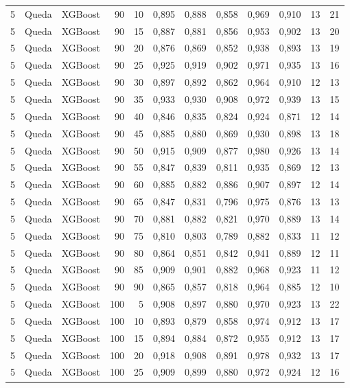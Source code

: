 \begin{longtable}{@{}rllrrrrrrrrr@{}}
5 & Queda & XGBoost & 90 & 10 & 0,895 & 0,888 & 0,858 & 0,969 & 0,910 & 13 & 21 \\
5 & Queda & XGBoost & 90 & 15 & 0,887 & 0,881 & 0,856 & 0,953 & 0,902 & 13 & 20 \\
5 & Queda & XGBoost & 90 & 20 & 0,876 & 0,869 & 0,852 & 0,938 & 0,893 & 13 & 19 \\
5 & Queda & XGBoost & 90 & 25 & 0,925 & 0,919 & 0,902 & 0,971 & 0,935 & 13 & 16 \\
5 & Queda & XGBoost & 90 & 30 & 0,897 & 0,892 & 0,862 & 0,964 & 0,910 & 12 & 13 \\
5 & Queda & XGBoost & 90 & 35 & 0,933 & 0,930 & 0,908 & 0,972 & 0,939 & 13 & 15 \\
5 & Queda & XGBoost & 90 & 40 & 0,846 & 0,835 & 0,824 & 0,924 & 0,871 & 12 & 14 \\
5 & Queda & XGBoost & 90 & 45 & 0,885 & 0,880 & 0,869 & 0,930 & 0,898 & 13 & 18 \\
5 & Queda & XGBoost & 90 & 50 & 0,915 & 0,909 & 0,877 & 0,980 & 0,926 & 13 & 14 \\
5 & Queda & XGBoost & 90 & 55 & 0,847 & 0,839 & 0,811 & 0,935 & 0,869 & 12 & 13 \\
5 & Queda & XGBoost & 90 & 60 & 0,885 & 0,882 & 0,886 & 0,907 & 0,897 & 12 & 14 \\
5 & Queda & XGBoost & 90 & 65 & 0,847 & 0,831 & 0,796 & 0,975 & 0,876 & 13 & 13 \\
5 & Queda & XGBoost & 90 & 70 & 0,881 & 0,882 & 0,821 & 0,970 & 0,889 & 13 & 14 \\
5 & Queda & XGBoost & 90 & 75 & 0,810 & 0,803 & 0,789 & 0,882 & 0,833 & 11 & 12 \\
5 & Queda & XGBoost & 90 & 80 & 0,864 & 0,851 & 0,842 & 0,941 & 0,889 & 12 & 11 \\
5 & Queda & XGBoost & 90 & 85 & 0,909 & 0,901 & 0,882 & 0,968 & 0,923 & 11 & 12 \\
5 & Queda & XGBoost & 90 & 90 & 0,865 & 0,857 & 0,818 & 0,964 & 0,885 & 12 & 10 \\
5 & Queda & XGBoost & 100 & 5 & 0,908 & 0,897 & 0,880 & 0,970 & 0,923 & 13 & 22 \\
5 & Queda & XGBoost & 100 & 10 & 0,893 & 0,879 & 0,858 & 0,974 & 0,912 & 13 & 17 \\
5 & Queda & XGBoost & 100 & 15 & 0,894 & 0,884 & 0,872 & 0,955 & 0,912 & 13 & 17 \\
5 & Queda & XGBoost & 100 & 20 & 0,918 & 0,908 & 0,891 & 0,978 & 0,932 & 13 & 17 \\
5 & Queda & XGBoost & 100 & 25 & 0,909 & 0,899 & 0,880 & 0,972 & 0,924 & 12 & 16 \\

\end{longtable}
